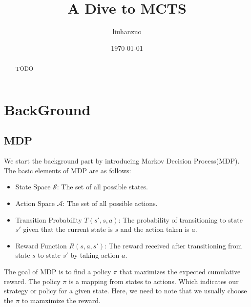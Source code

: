 \documentclass[11pt]{article}
\begin{document}
\title{A Dive to MCTS}
\author{liuhanzuo}
\date{\today}
\maketitle
\begin{abstract}
    TODO
\end{abstract}
\section{BackGround}
\subsection{MDP}
We start the background part by introducing Markov Decision Process(MDP). The basic elements of MDP are as follows:
\begin{itemize}
    \item State Space $\mathcal{S}$: The set of all possible states.
    \item Action Space $\mathcal{A}$: The set of all possible actions.
    \item Transition Probability $T(s',s,a)$: The probability of transitioning to state $s'$ given that the current state is $s$ and the action taken is $a$.
    \item Reward Function $R(s,a,s')$: The reward received after transitioning from state $s$ to state $s'$ by taking action $a$.
\end{itemize}
The goal of MDP is to find a policy $\pi$ that maximizes the expected cumulative reward. The policy $\pi$ is a mapping from states to actions. Which indicates our strategy or policy for a given state. Here, we need to note that we usually choose the $\pi$ to mamximize the reward.
\end{document}
